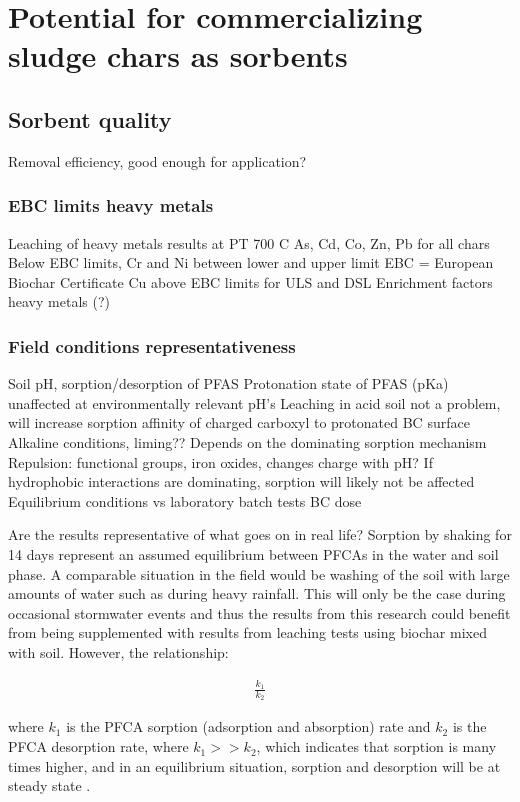 \section{Potential for commercializing sludge chars as sorbents}
\subsection{Sorbent quality}
Removal efficiency, good enough for application?
\subsubsection{EBC limits heavy metals}
Leaching of heavy metals results at PT 700 C
    As, Cd, Co, Zn, Pb for all chars Below EBC limits, Cr and Ni between lower and upper limit
    EBC = European Biochar Certificate
    Cu above EBC limits for ULS and DSL
    Enrichment factors heavy metals (?)

\subsubsection{Field conditions representativeness}
Soil pH, sorption/desorption of PFAS
Protonation state of PFAS (pKa) unaffected at environmentally relevant pH’s
Leaching in acid soil not a problem, will increase sorption affinity of charged carboxyl to protonated BC surface
Alkaline conditions, liming?? 
    Depends on the dominating sorption mechanism
    Repulsion: functional groups, iron oxides, changes charge with pH?
    If hydrophobic interactions are dominating, sorption will likely not be affected
Equilibrium conditions vs laboratory batch tests
BC dose

Are the results representative of what goes on in real life? Sorption by shaking for 14 days represent an assumed equilibrium between PFCAs in the water and soil phase. A comparable situation in the field would be washing of the soil with large amounts of water such as during heavy rainfall. This will only be the case during occasional stormwater events and thus the results from this research could benefit from being supplemented with results from leaching tests using biochar mixed with soil. However, the relationship:

\begin{align}
    \frac{k_1}{k_2}
\end{align}

where \(k_1\) is the PFCA sorption (adsorption and absorption) rate and \(k_2\) is the PFCA desorption rate, where \(k_1>>k_2\), which indicates that sorption is many times higher, and in an equilibrium situation, sorption and desorption will be at steady state \citep{Cornelissen2005}. 


